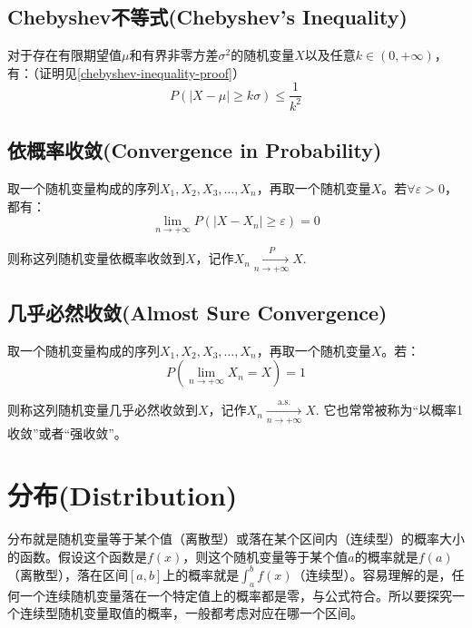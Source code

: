 \documentclass[UTF8]{ctexbook}
\begin{document}
\section{Chebyshev不等式(Chebyshev's Inequality)}
\label{chebyshev-inequality}
对于存在有限期望值$\mu$和有界非零方差$\sigma^2$的随机变量$X$以及任意$k\in(0,+\infty)$，有：（证明见\ref{chebyshev-inequality-proof}）
\[
	P(|X-\mu|\geq k\sigma)\leq\frac{1}{k^2}
\]
\section{依概率收敛(Convergence in Probability)}
\label{convg-in-prob}
取一个随机变量构成的序列$X_1,X_2,X_3,\dots,X_n$，再取一个随机变量$X$。若$\forall\varepsilon>0$，都有：
\[
	\lim_{n\to+\infty}P(|X-X_n|\geq\varepsilon)=0
\]

则称这列随机变量依概率收敛到$X$，记作$X_n\xrightarrow[n\to+\infty]{P}X$.
\section{几乎必然收敛(Almost Sure Convergence)}
取一个随机变量构成的序列$X_1,X_2,X_3,\dots,X_n$，再取一个随机变量$X$。若：
\[
	P(\lim_{n\to+\infty}X_n=X)=1
\]

则称这列随机变量几乎必然收敛到$X$，记作$X_n\xrightarrow[n\to+\infty]{\mathrm{a.s.}}X$. 它也常常被称为“以概率1收敛”或者“强收敛”。
\chapter{分布(Distribution)}
分布就是随机变量等于某个值（离散型）或落在某个区间内（连续型）的概率大小的函数。假设这个函数是$f(x)$，则这个随机变量等于某个值$a$的概率就是$f(a)$（离散型），落在区间$[a,b]$上的概率就是$\int_a^bf(x)$（连续型）。容易理解的是，任何一个连续随机变量落在一个特定值上的概率都是零，与公式符合。所以要探究一个连续型随机变量取值的概率，一般都考虑对应在哪一个区间。
\end{document}
